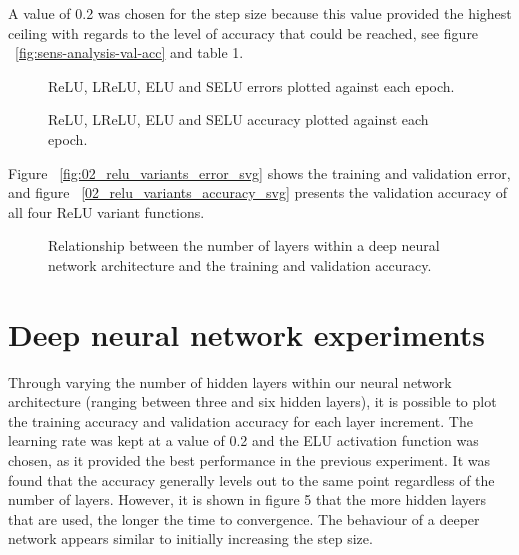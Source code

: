 \documentclass{article}
\begin{document}
A value of 0.2 was chosen for the step size because this value provided the highest ceiling with regards to the level of accuracy that could be reached, see figure ~\ref{fig:sens-analysis-val-acc} and table 1.

\begin{figure}[tb]
\vskip 5mm
\begin{center}
\centerline{}
\caption{ReLU, LReLU, ELU and SELU errors plotted against each epoch.}
\label{fig:relu-variants-error}
\end{center}
\vskip -5mm
\end{figure}

\begin{figure}[tb]
\vskip 5mm
\begin{center}
\centerline{}
\caption{ReLU, LReLU, ELU and SELU accuracy plotted against each epoch.}
\label{fig:relu-variants-accuracy}
\end{center}
\vskip -5mm
\end{figure}

Figure ~\ref{fig:02_relu_variants_error_svg} shows the training and validation error, and figure ~\ref{02_relu_variants_accuracy_svg} presents the validation accuracy of all four ReLU variant functions.

\begin{figure}[tb]
\vskip 5mm
\begin{center}
\centerline{}
\caption{Relationship between the number of layers within a deep neural network architecture and the training and validation accuracy.}
\label{fig:dnn-accuracy}
\end{center}
\vskip -5mm
\end{figure}

\section{Deep neural network experiments}
\label{sec:dnnexpts}

Through varying the number of hidden layers within our neural network architecture (ranging between three and six hidden layers), it is possible to plot the training accuracy and validation accuracy for each layer increment. The learning rate was kept at a value of 0.2 and the ELU activation function was chosen, as it provided the best performance in the previous experiment. It was found that the accuracy generally levels out to the same point regardless of the number of layers. However, it is shown in figure 5 that the more hidden layers that are used, the longer the time to convergence. The behaviour of a deeper network appears similar to initially increasing the step size.
\end{document}
